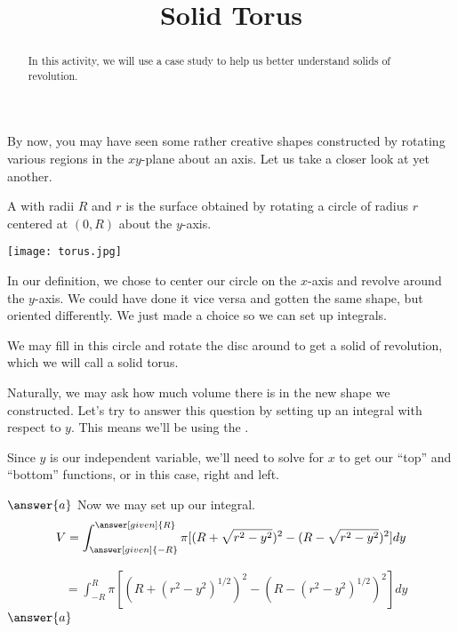 \documentclass{ximera}
\title{Solid Torus}
\begin{document}
\begin{abstract}
In this activity, we will use a case study to help us better understand solids of revolution.
\end{abstract}
\maketitle

By now, you may have seen some rather creative shapes constructed by rotating various regions in the $xy$-plane about an axis. Let us take a closer look at yet another.
\begin{definition}
	A  with radii $R$ and $r$ is the surface obtained by rotating a circle of radius $r$ centered at $(0,R)$ about the $y$-axis.
\end{definition}

\begin{image}
	\label{torus}
	\texttt{[image: torus.jpg]}
\end{image}

\begin{remark}
	In our definition, we chose to center our circle on the $x$-axis and revolve around the $y$-axis. We could have done it vice versa and gotten the same shape, but oriented differently. We just made a choice so we can set up integrals.
\end{remark} 

We may fill in this circle and rotate the disc around to get a solid of revolution, which we will call a solid torus.

\begin{exercise}
	Naturally, we may ask how much volume there is in the new shape we constructed. Let's try to answer this question by setting up an integral with respect to $y$. This means we'll be using the  .
	
	Since $y$ is our independent variable, we'll need to solve for $x$ to get our ``top'' and ``bottom'' functions, or in this case, right and left.
	
	$\answer{a}$
	Now we may set up our integral.
	\begin{align*}
		V  &= \int_{\answer[given]{-R}}^{\answer[given]{R}} \pi [ (R+\sqrt{r^2-y^2})^{2}-(R-\sqrt{r^2-y^2})^{2}] dy \\
	\end{align*}
	\begin{exercise}
		\begin{align*}
			&= \int_{-R}^{R} \pi [ (R+(r^2-y^2)^{1/2})^{2}-(R-(r^2-y^2)^{1/2})^{2}] dy
		\end{align*}
		$\answer{a}$
	\end{exercise}
\end{exercise}
\end{document}
